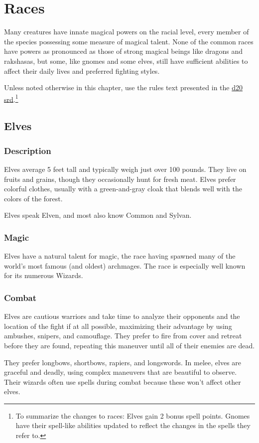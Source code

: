 \section{Races}
Many creatures have innate magical powers on the racial level, every member of the species possessing some measure of magical talent. None of the common races have powers as pronounced as those of strong magical beings like dragons and rakshasas, but some, like gnomes and some elves, still have sufficient abilities to affect their daily lives and preferred fighting styles.

Unless noted otherwise in this chapter, use the rules text presented in the \href{http://www.wizards.com/default.asp?x=d20/article/srd35}{d20 srd}.\footnote{To summarize the changes to races: Elves gain 2 bonus spell points. Gnomes have their spell-like abilities updated to reflect the changes in the spells they refer to.}
\subsection{Elves}
\subsubsection{Description}
Elves average 5 feet tall and typically weigh just over 100 pounds. They live on fruits and grains, though they occasionally hunt for fresh meat. Elves prefer colorful clothes, usually with a green-and-gray cloak that blends well with the colors of the forest.

Elves speak Elven, and most also know Common and Sylvan.
\subsubsection{Magic}
Elves have a natural talent for magic, the race having spawned many of the world's most famous (and oldest) archmages. The race is especially well known for its numerous Wizards.
\subsubsection{Combat}
Elves are cautious warriors and take time to analyze their opponents and the location of the fight if at all possible, maximizing their advantage by using ambushes, snipers, and camouflage. They prefer to fire from cover and retreat before they are found, repeating this maneuver until all of their enemies are dead.

They prefer longbows, shortbows, rapiers, and longswords. In melee, elves are graceful and deadly, using complex maneuvers that are beautiful to observe. Their wizards often use  spells during combat because these won't affect other elves.
